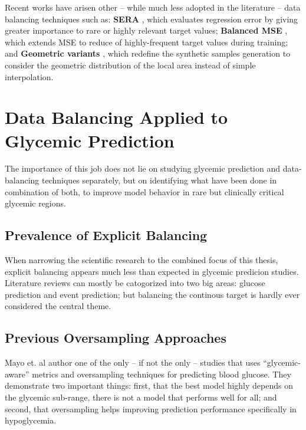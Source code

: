 \vspace{1em}

Recent works have arisen other -- while much less adopted in the literature -- data balancing techniques such as: \textbf{SERA} \cite{5178874}, which evaluates regression error by giving greater importance to rare or highly relevant target values; \textbf{Balanced MSE} \cite{Ren_2022_CVPR}, which extends MSE to reduce of highly-frequent target values during training; and \textbf{Geometric variants} \cite{CAMACHO2022116387}, which redefine the synthetic samples generation to consider the geometric distribution of the local area instead of simple interpolation.

\section{Data Balancing Applied to Glycemic Prediction}
\label{sec:soa_data_balanding_glycemic_prediction}
The importance of this job does not lie on studying glycemic prediction and data-balancing techniques separately, but on identifying what have been done in combination of both, to improve model behavior in rare but clinically critical glycemic regions.

\subsection{Prevalence of Explicit Balancing}
\label{subsec:soa_data_balancing_prevalence}

When narrowing the scientific research to the combined focus of this thesis, explicit balancing appears much less than expected in glycemic predicion studies. Literature reviews \cite{info:doi/10.2196/34699} can mostly be catogorized into two big areas: glucose prediction and event prediction; but balancing the continous target is hardly ever considered the central theme.

\subsection{Previous Oversampling Approaches}
\label{subsec:soa_oversampling_approaches}

Mayo et. al \cite{10.1371/journal.pone.0225613} author one of the only -- if not the only -- studies that uses “glycemic-aware” metrics and oversampling techniques for predicting blood glucose. They demonstrate two important things: first, that the best model highly depends on the glycemic sub-range, there is not a model that performs well for all; and second, that oversampling helps improving prediction performance specifically in hypoglycemia. 

